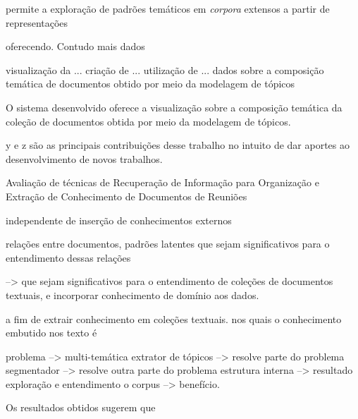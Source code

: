 permite a exploração de padrões temáticos em \textit{corpora} extensos a partir de representações 



oferecendo.
 Contudo mais dados 

visualização da ...
criação de ... 
utilização de ...
dados sobre a composição temática de documentos obtido por meio da modelagem de tópicos

O sistema desenvolvido oferece a visualização sobre a composição temática da coleção de documentos obtida por meio da modelagem de tópicos.



y e z são as principais contribuições desse trabalho no intuito de dar aportes ao desenvolvimento de novos trabalhos.  

Avaliação de técnicas de Recuperação de Informação para Organização e Extração de Conhecimento de Documentos de Reuniões 


independente de inserção de conhecimentos externos 


relações entre documentos, padrões latentes que sejam significativos para o entendimento
dessas relações

--> que sejam significativos para o entendimento de coleções de documentos textuais, e incorporar conhecimento de domínio aos dados.




a fim de extrair conhecimento em coleções textuais.  
nos quais o conhecimento embutido nos texto é 




problema --> multi-temática
extrator de tópicos --> resolve parte do problema
segmentador --> resolve outra parte do problema
estrutura interna --> resultado
exploração e entendimento o corpus --> benefício.


Os resultados obtidos sugerem que 

















